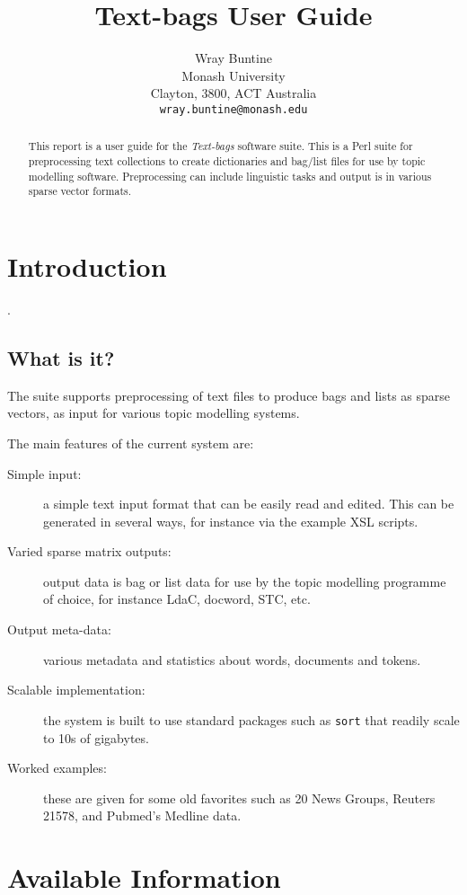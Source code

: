 \documentclass{article}
\author{Wray Buntine\\
  Monash University\\
  Clayton, 3800, ACT Australia\\
  \texttt{wray.buntine@monash.edu}
 }
\title{Text-bags User Guide}
\begin{document}
\maketitle


\begin{abstract}
This report is a user guide for the
\emph{Text-bags} 
software suite.
This is a Perl suite for preprocessing text collections
to create dictionaries and bag/list files for use
by topic modelling software. Preprocessing can include
linguistic tasks and output is in various sparse vector formats.
\end{abstract}

\newpage
\thispagestyle{empty}
\tableofcontents
\newpage
\setcounter{page}{1}


\section{Introduction}

.	

\subsection{What is it?}

The suite supports preprocessing of text files to produce
bags and lists as sparse vectors, as input for various
topic modelling systems.

The main features of the current system are:
\begin{description}
\item[Simple input:]
a simple text input format that can be easily read and edited.
This can be generated in several ways,
for instance via the example XSL scripts.
\item[Varied sparse matrix outputs:]
output data is bag or list data for use by the topic modelling
programme of choice,
for instance LdaC, docword, STC, etc.
\item[Output meta-data:]
various metadata and statistics about words,
documents and tokens.
\item[Scalable implementation:]
the system is built to use standard packages such as {\tt sort}
that readily scale to 10s of gigabytes.
\item[Worked examples:]
these are given for some old favorites such as 20 News Groups,
Reuters 21578, and Pubmed's Medline data.
\end{description}

\section{Available Information}
\end{document}
